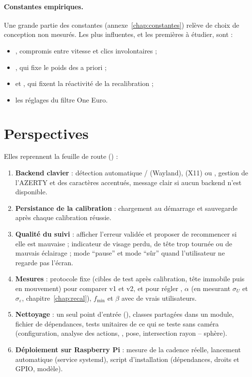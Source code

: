 \paragraph{Constantes empiriques.} Une grande partie des constantes (annexe~\ref{chap:constantes}) relève de choix de conception non mesurés. Les plus influentes, et les premières à étudier, sont :
\begin{itemize}
  \item {}, compromis entre vitesse et clics involontaires ;
  \item {}, qui fixe le poids des a priori ;
  \item {} et , qui fixent la réactivité de la recalibration ;
  \item les réglages du filtre One Euro.
\end{itemize}

\section{Perspectives}

Elles reprennent la feuille de route () :
\begin{enumerate}
  \item \textbf{Backend clavier} : détection automatique / (Wayland),  (X11) ou , gestion de l'AZERTY et des caractères accentués, message clair si aucun backend n'est disponible.
  \item \textbf{Persistance de la calibration} : chargement au démarrage et sauvegarde après chaque calibration réussie.
  \item \textbf{Qualité du suivi} : afficher l'erreur validée et proposer de recommencer si elle est mauvaise ; indicateur de visage perdu, de tête trop tournée ou de mauvais éclairage ; mode \enquote{pause} et mode \enquote{sûr} quand l'utilisateur ne regarde pas l'écran.
  \item \textbf{Mesures} : protocole fixe (cibles de test après calibration, tête immobile puis en mouvement) pour comparer v1 et v2, et pour régler , $\alpha$ (en mesurant $\sigma_U$ et $\sigma_\varepsilon$, chapitre~\ref{chap:recal}), $f_{\min}$ et $\beta$ avec de vrais utilisateurs.
  \item \textbf{Nettoyage} : un seul point d'entrée (), classes partagées dans un module, fichier de dépendances, tests unitaires de ce qui se teste sans caméra (configuration, analyse des actions, , pose, intersection rayon -- sphère).
  \item \textbf{Déploiement sur Raspberry Pi} : mesure de la cadence réelle, lancement automatique (service systemd), script d'installation (dépendances, droits  et GPIO, modèle).
\end{enumerate}
